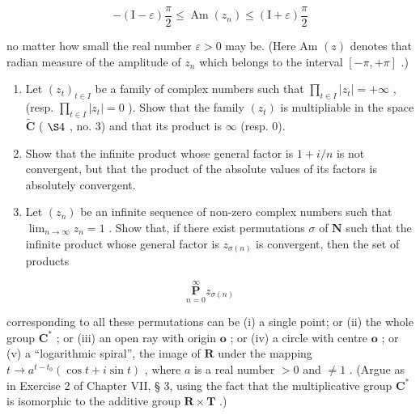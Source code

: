 \[
- (\mathrm{I} - \varepsilon) \frac {\pi}{2} \leqslant \operatorname{Am} (z _ {n}) \leqslant (\mathrm{I} + \varepsilon) \frac {\pi}{2}
\]

no matter how small the real number \(\varepsilon > 0\) may be. (Here Am \((z)\) denotes that radian measure of the amplitude of \(z_{n}\) which belongs to the interval \([- \pi, +\pi]\) .)

\begin{enumerate}
\def\labelenumi{\arabic{enumi})}
\setcounter{enumi}{2}
\item
  Let \((z_{t})_{t\in I}\) be a family of complex numbers such that \(\prod_{t\in I}|z_t| = +\infty\) , (resp. \(\prod_{t\in I}|z_t| = 0\) ). Show that the family \((z_{t})\) is multipliable in the space \(\tilde{\mathbf{C}}\) ( \(\S 4\) , no. 3) and that its product is \(\infty\) (resp. 0).
\item
  Show that the infinite product whose general factor is \(1 + i/n\) is not convergent, but that the product of the absolute values of its factors is absolutely convergent.
\item
  Let \((z_{n})\) be an infinite sequence of non-zero complex numbers such that \(\lim_{n\to \infty}z_n = 1\) . Show that, if there exist permutations \(\sigma\) of \(\mathbf{N}\) such that the infinite product whose general factor is \(z_{\sigma (n)}\) is convergent, then the set of products
\end{enumerate}

\[
\underset {n = 0} {\overset {\infty} {\mathbf {P}}} z _ {\sigma (n)}
\]

corresponding to all these permutations can be (i) a single point; or (ii) the whole group \(\mathbf{C}^*\) ; or (iii) an open ray with origin \(\mathbf{o}\) ; or (iv) a circle with centre \(\mathbf{o}\) ; or (v) a ``logarithmic spiral'', the image of \(\mathbf{R}\) under the mapping \(t \to a^{t - t_0} (\cos t + i \sin t)\) , where \(a\) is a real number \(>0\) and \(\neq 1\) . (Argue as in Exercise 2 of Chapter VII, § 3, using the fact that the multiplicative group \(\mathbf{C}^*\) is isomorphic to the additive group \(\mathbf{R} \times \mathbf{T}\) .)

